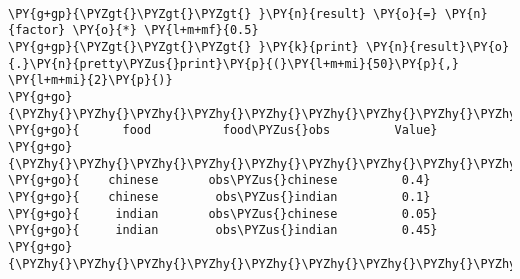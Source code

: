 \begin{example}
\begin{Verbatim}[commandchars=\\\{\}]

\PY{g+gp}{\PYZgt{}\PYZgt{}\PYZgt{} }\PY{n}{result} \PY{o}{=} \PY{n}{factor} \PY{o}{*} \PY{l+m+mf}{0.5}
\PY{g+gp}{\PYZgt{}\PYZgt{}\PYZgt{} }\PY{k}{print} \PY{n}{result}\PY{o}{.}\PY{n}{pretty\PYZus{}print}\PY{p}{(}\PY{l+m+mi}{50}\PY{p}{,} \PY{l+m+mi}{2}\PY{p}{)}
\PY{g+go}{\PYZhy{}\PYZhy{}\PYZhy{}\PYZhy{}\PYZhy{}\PYZhy{}\PYZhy{}\PYZhy{}\PYZhy{}\PYZhy{}\PYZhy{}\PYZhy{}\PYZhy{}\PYZhy{}\PYZhy{}\PYZhy{}\PYZhy{}\PYZhy{}\PYZhy{}\PYZhy{}\PYZhy{}\PYZhy{}\PYZhy{}\PYZhy{}\PYZhy{}\PYZhy{}\PYZhy{}\PYZhy{}\PYZhy{}\PYZhy{}\PYZhy{}\PYZhy{}\PYZhy{}\PYZhy{}\PYZhy{}\PYZhy{}\PYZhy{}\PYZhy{}\PYZhy{}\PYZhy{}\PYZhy{}\PYZhy{}\PYZhy{}\PYZhy{}\PYZhy{}\PYZhy{}\PYZhy{}\PYZhy{}\PYZhy{}\PYZhy{}}
\PY{g+go}{      food          food\PYZus{}obs         Value}
\PY{g+go}{\PYZhy{}\PYZhy{}\PYZhy{}\PYZhy{}\PYZhy{}\PYZhy{}\PYZhy{}\PYZhy{}\PYZhy{}\PYZhy{}\PYZhy{}\PYZhy{}\PYZhy{}\PYZhy{}\PYZhy{}\PYZhy{}\PYZhy{}\PYZhy{}\PYZhy{}\PYZhy{}\PYZhy{}\PYZhy{}\PYZhy{}\PYZhy{}\PYZhy{}\PYZhy{}\PYZhy{}\PYZhy{}\PYZhy{}\PYZhy{}\PYZhy{}\PYZhy{}\PYZhy{}\PYZhy{}\PYZhy{}\PYZhy{}\PYZhy{}\PYZhy{}\PYZhy{}\PYZhy{}\PYZhy{}\PYZhy{}\PYZhy{}\PYZhy{}\PYZhy{}\PYZhy{}\PYZhy{}\PYZhy{}\PYZhy{}\PYZhy{}}
\PY{g+go}{    chinese       obs\PYZus{}chinese         0.4}
\PY{g+go}{    chinese        obs\PYZus{}indian         0.1}
\PY{g+go}{     indian       obs\PYZus{}chinese         0.05}
\PY{g+go}{     indian        obs\PYZus{}indian         0.45}
\PY{g+go}{\PYZhy{}\PYZhy{}\PYZhy{}\PYZhy{}\PYZhy{}\PYZhy{}\PYZhy{}\PYZhy{}\PYZhy{}\PYZhy{}\PYZhy{}\PYZhy{}\PYZhy{}\PYZhy{}\PYZhy{}\PYZhy{}\PYZhy{}\PYZhy{}\PYZhy{}\PYZhy{}\PYZhy{}\PYZhy{}\PYZhy{}\PYZhy{}\PYZhy{}\PYZhy{}\PYZhy{}\PYZhy{}\PYZhy{}\PYZhy{}\PYZhy{}\PYZhy{}\PYZhy{}\PYZhy{}\PYZhy{}\PYZhy{}\PYZhy{}\PYZhy{}\PYZhy{}\PYZhy{}\PYZhy{}\PYZhy{}\PYZhy{}\PYZhy{}\PYZhy{}\PYZhy{}\PYZhy{}\PYZhy{}\PYZhy{}\PYZhy{}}
\end{Verbatim}
\caption{Násobení faktorů konstantou}
\label{lst:facmulk}
\end{example}


